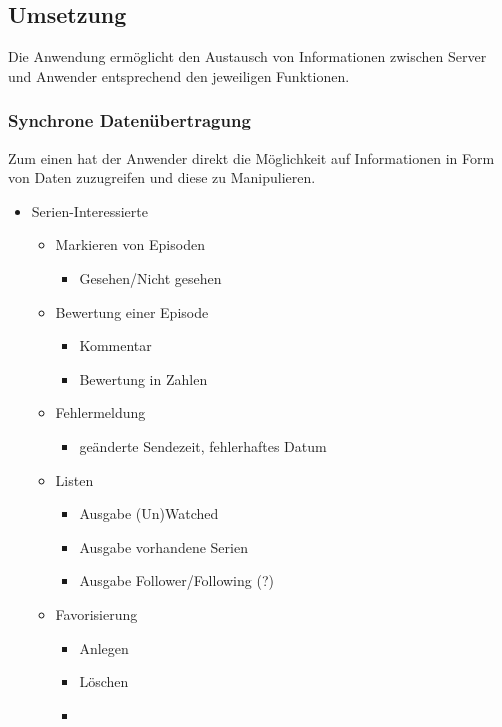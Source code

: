 \documentclass[a4paper]{article}
\begin{document}
\subsection{Umsetzung}
Die Anwendung ermöglicht den Austausch von Informationen zwischen Server und Anwender entsprechend den jeweiligen Funktionen.

\subsubsection{Synchrone Datenübertragung}

Zum einen hat der Anwender direkt die Möglichkeit auf Informationen in Form von Daten zuzugreifen und diese zu Manipulieren.

\begin{itemize}
\item
Serien-Interessierte
	\begin{itemize}
	\item
    Markieren von Episoden
    	\begin{itemize}
    	\item
     	Gesehen/Nicht gesehen
     	\end{itemize}
    \item
    Bewertung einer Episode
      	\begin{itemize}
      	\item
        Kommentar
        \item
        Bewertung in Zahlen
        \end{itemize}
     \item
     Fehlermeldung
     	\begin{itemize}
     	\item
        geänderte Sendezeit, fehlerhaftes Datum
        \end{itemize}
     \item
     Listen
     	\begin{itemize}
     	\item
    	Ausgabe (Un)Watched
    	\item
     	Ausgabe vorhandene Serien
     	\item
     	Ausgabe Follower/Following (?)
     	\end{itemize}
     \item
     Favorisierung
   	  	\begin{itemize}
   	  	\item
   	  	Anlegen
   	  	\item
   	  	Löschen
   	  	\item

\end{itemize}
\end{itemize}
\end{itemize}
\end{document}
